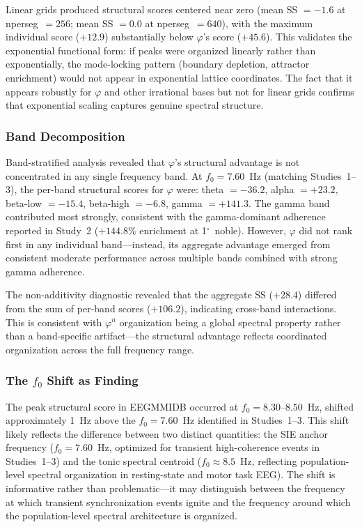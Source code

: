 \documentclass[11pt,a4paper]{article}
\newcommand{\degree}{$^\circ$}  %
\newcommand{\phisym}{\varphi}
\begin{document}
Linear grids produced structural scores centered near zero (mean SS $= -1.6$ at nperseg~$= 256$; mean SS $= 0.0$ at nperseg~$= 640$), with the maximum individual score ($+12.9$) substantially below $\phisym$'s score ($+45.6$). This validates the exponential functional form: if peaks were organized linearly rather than exponentially, the mode-locking pattern (boundary depletion, attractor enrichment) would not appear in exponential lattice coordinates. The fact that it appears robustly for $\phisym$ and other irrational bases but not for linear grids confirms that exponential scaling captures genuine spectral structure.

\subsubsection{Band Decomposition}
\label{sec:study4_bands}

Band-stratified analysis revealed that $\phisym$'s structural advantage is not concentrated in any single frequency band. At $f_0 = 7.60$~Hz (matching Studies~1--3), the per-band structural scores for $\phisym$ were: theta $= -36.2$, alpha $= +23.2$, beta-low $= -15.4$, beta-high $= -6.8$, gamma $= +141.3$. The gamma band contributed most strongly, consistent with the gamma-dominant adherence reported in Study~2 ($+144.8\%$ enrichment at 1\degree\ noble). However, $\phisym$ did not rank first in any individual band---instead, its aggregate advantage emerged from consistent moderate performance across multiple bands combined with strong gamma adherence.

The non-additivity diagnostic revealed that the aggregate SS ($+28.4$) differed from the sum of per-band scores ($+106.2$), indicating cross-band interactions. This is consistent with $\phisym^n$ organization being a global spectral property rather than a band-specific artifact---the structural advantage reflects coordinated organization across the full frequency range.

\subsubsection{The $f_0$ Shift as Finding}
\label{sec:study4_f0shift}

The peak structural score in EEGMMIDB occurred at $f_0 = 8.30$--$8.50$~Hz, shifted approximately 1~Hz above the $f_0 = 7.60$~Hz identified in Studies~1--3. This shift likely reflects the difference between two distinct quantities: the SIE anchor frequency ($f_0 = 7.60$~Hz, optimized for transient high-coherence events in Studies~1--3) and the tonic spectral centroid ($f_0 \approx 8.5$~Hz, reflecting population-level spectral organization in resting-state and motor task EEG). The shift is informative rather than problematic---it may distinguish between the frequency at which transient synchronization events ignite and the frequency around which the population-level spectral architecture is organized.
\end{document}
